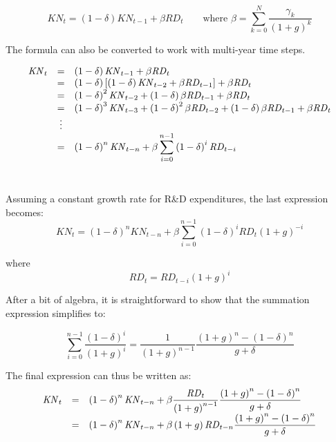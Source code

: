 \[
\mathit{KN}_{t} = \displaystyle \left(1-\delta \right) \mathit{KN}_{t-1}
+ \beta \mathit{RD}_{t} \qquad \textrm{where } \beta = \displaystyle \sum_{k=0}^N{ \frac{\gamma_{k}}{\left(1+g\right)^k} }
\]

\noindent The formula can also be converted to work with multi-year time steps.

\[
\begin{array}{l c l}
\mathit{KN}_{t}
& = & \displaystyle \left(1-\delta \right) \mathit{KN}_{t-1} + \beta \mathit{RD}_{t} \\
{} & = & \displaystyle \left(1-\delta \right) \left[\left(1-\delta \right) \mathit{KN}_{t-2} + \beta \mathit{RD}_{t-1} \right] + \beta \mathit{RD}_{t} \\
{} & = & \displaystyle \left(1-\delta \right)^2 \mathit{KN}_{t-2} + \left(1-\delta \right) \beta \mathit{RD}_{t-1} + \beta \mathit{RD}_{t} \\
{} & = & \displaystyle \left(1-\delta \right)^3 \mathit{KN}_{t-3} + \left(1-\delta \right)^2 \beta \mathit{RD}_{t-2} + \left(1-\delta \right) \beta \mathit{RD}_{t-1} + \beta \mathit{RD}_{t} \\
{} & \vdots & {} \\
{} & = & \displaystyle \left(1-\delta \right)^n \mathit{KN}_{t-n} + \beta \sum_{i=0}^{n-1}{\left(1-\delta \right)^i  \mathit{RD}_{t-i}} \\
\end{array}
\]\

\noindent Assuming a constant growth rate for R\&D expenditures, the last expression becomes:
\[
\mathit{KN}_{t} = \displaystyle \left(1-\delta \right)^n \mathit{KN}_{t-n} + \beta \sum_{i=0}^{n-1}{\left(1-\delta \right)^i  \mathit{RD}_{t} \left(1+g\right)^{-i}}
\]

\noindent where
\[
\mathit{RD}_{t} = \mathit{RD}_{t-i}  \left(1+g\right)^{i}
\]

\noindent After a bit of algebra, it is straightforward to show that the summation expression simplifies to:

\[
\sum_{i=0}^{n-1}{\frac{\left(1-\delta \right)^i} {\left(1+g\right)^{i}}} = \frac{1}{\left( 1 + g\right)^{n-1}}
\frac{\left(1+g\right)^n - \left(1-\delta\right)^n}{g + \delta}
\]

\noindent The final expression can thus be written as:
\[
\begin{array}{l c l}
\mathit{KN}_{t} & = & \displaystyle \left(1-\delta \right)^n \mathit{KN}_{t-n} + \beta \frac{\mathit{RD}_{t}}{\left( 1 + g\right)^{n-1}} \frac{\left(1+g\right)^n - \left(1-\delta\right)^n}{g + \delta} \\
& = & \displaystyle \left(1-\delta \right)^n \mathit{KN}_{t-n} + {\beta\left( 1 + g\right)\mathit{RD}_{t-n}} \frac{\left(1+g\right)^n - \left(1-\delta\right)^n}{g + \delta} \\
\end{array}
\]


